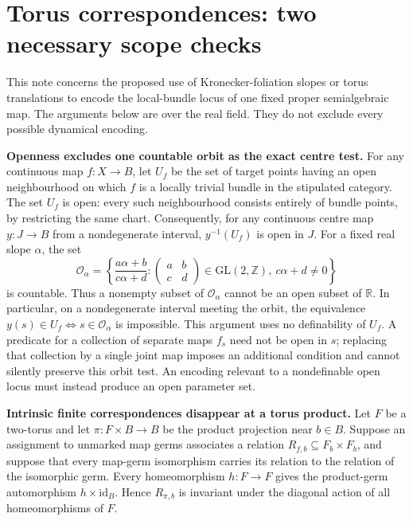 \section*{Torus correspondences: two necessary scope checks}

This note concerns the proposed use of Kronecker-foliation slopes or torus
translations to encode the local-bundle locus of one fixed proper
semialgebraic map. The arguments below are over the real field. They do not
exclude every possible dynamical encoding.

\textbf{Openness excludes one countable orbit as the exact centre test.}
For any continuous map $f:X\to B$, let $U_f$ be the set of target points
having an open neighbourhood on which $f$ is a locally trivial bundle in
the stipulated category. The set $U_f$ is open: every such neighbourhood
consists entirely of bundle points, by restricting the same chart.
Consequently, for any continuous centre map $y:J\to B$ from a
nondegenerate interval,
$y^{-1}(U_f)$ is open in $J$. For a fixed real slope $\alpha$, the set
\[
 \mathcal O_\alpha=
 \left\{\frac{a\alpha+b}{c\alpha+d}:
 \begin{pmatrix}a&b\\c&d\end{pmatrix}\in\mathrm{GL}(2,\mathbb Z),\
 c\alpha+d\ne0\right\}
\]
is countable. Thus a nonempty subset of $\mathcal O_\alpha$ cannot be an
open subset of $\mathbb R$. In particular, on a nondegenerate interval meeting the
orbit, the equivalence
$y(s)\in U_f\Longleftrightarrow s\in\mathcal O_\alpha$ is impossible.
This argument uses no definability of $U_f$. A predicate for a collection
of separate maps $f_s$ need not be open in $s$; replacing that collection
by a single joint map imposes an additional condition and cannot silently
preserve this orbit test. An encoding relevant to a nondefinable open
locus must instead produce an open parameter set.

\textbf{Intrinsic finite correspondences disappear at a torus product.}
Let $F$ be a two-torus and let $\pi:F\times B\to B$ be the product
projection near $b\in B$. Suppose an assignment to unmarked map germs
associates a relation $R_{f,b}\subseteq F_b\times F_b$, and suppose that
every map-germ isomorphism carries its relation to the relation of the
isomorphic germ. Every homeomorphism $h:F\to F$ gives the product-germ
automorphism $h\times\mathrm{id}_B$. Hence $R_{\pi,b}$ is invariant under
the diagonal action of all homeomorphisms of $F$.

